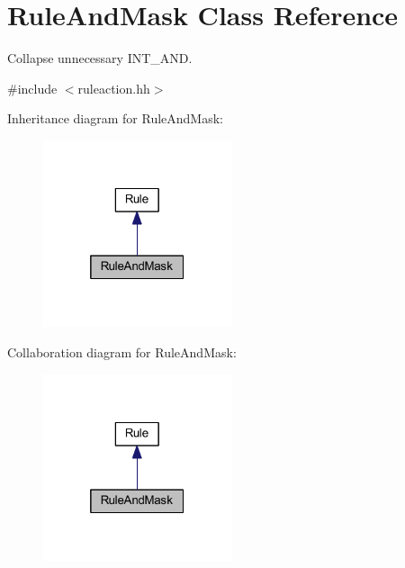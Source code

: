 \hypertarget{class_rule_and_mask}{}\section{Rule\+And\+Mask Class Reference}
\label{class_rule_and_mask}


Collapse unnecessary I\+N\+T\+\_\+\+A\+ND.  




{\ttfamily \#include $<$ruleaction.\+hh$>$}



Inheritance diagram for Rule\+And\+Mask\+:
\nopagebreak
\begin{figure}[H]
\begin{center}
\leavevmode
\includegraphics[width=157pt]{class_rule_and_mask__inherit__graph}
\end{center}
\end{figure}


Collaboration diagram for Rule\+And\+Mask\+:
\nopagebreak
\begin{figure}[H]
\begin{center}
\leavevmode
\includegraphics[width=157pt]{class_rule_and_mask__coll__graph}
\end{center}
\end{figure}
